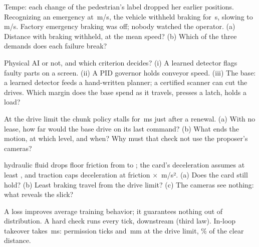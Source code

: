 \documentclass{studysheet}
\begin{document}
\begin{rightcol}
\begin{qs}
\item Tempe: each change of the pedestrian's label dropped her earlier positions. Recognizing an emergency at
  \,m/s, the vehicle withheld braking for \,s, slowing to \,m/s. Factory
  emergency braking was off; nobody watched the operator. (a) Distance with braking withheld, at the mean
  speed? (b) Which of the three demands does each failure break?
\item Physical AI or not, and which criterion decides? (i) A learned detector flags faulty parts on a
  screen. (ii) A PID governor holds conveyor speed. (iii) The base: a learned detector feeds a
  hand-written planner; a certified scanner can cut the drives. Which margin does the base spend as it
  travels, presses a latch, holds a load?
\item At the drive limit the chunk policy stalls for \,ms just after a renewal. (a) With no lease,
  how far would the base drive on its last command? (b) What ends the motion, at which level, and when? Why must that check
  not use the proposer's cameras?
\item \assumed{} hydraulic fluid drops floor friction from  to ; the card's deceleration
  assumes at least , and traction caps deceleration at friction $\times$ \,m/s².
  (a) Does the card still hold? (b) Least braking travel from the drive limit? (c) The cameras see nothing: what
  reveals the slick?
\end{qs}

\vspace{8pt}
%
  {A loss improves average training behavior; it guarantees nothing out of distribution. A hard check
   runs every tick, downstream (third law).}{}
%
  {In-loop takeover takes \,ms:  permission ticks and
   \,mm at the drive limit, \% of the clear distance.}{}
\end{rightcol}
\end{document}

